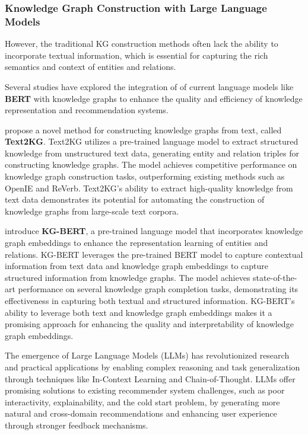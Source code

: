\documentclass{article}
\begin{document}
\subsubsection{Knowledge Graph Construction with Large Language Models}
However, the traditional KG construction methods often lack the ability to incorporate textual information, which is essential for capturing the rich semantics and context of entities and relations. 

Several studies have explored the integration of of current language models like \textbf{BERT} with knowledge graphs to enhance the quality and efficiency of knowledge representation and recommendation systems.

\textbf{\cite{xu2021text2kg}} propose a novel method for constructing knowledge graphs from text, called \textbf{Text2KG}. Text2KG utilizes a pre-trained language model to extract structured knowledge from unstructured text data, generating entity and relation triples for constructing knowledge graphs. The model achieves competitive performance on knowledge graph construction tasks, outperforming existing methods such as OpenIE and ReVerb. Text2KG's ability to extract high-quality knowledge from text data demonstrates its potential for automating the construction of knowledge graphs from large-scale text corpora.

\textbf{\cite{zhang2021kgbert}} introduce \textbf{KG-BERT}, a pre-trained language model that incorporates knowledge graph embeddings to enhance the representation learning of entities and relations. KG-BERT leverages the pre-trained BERT model to capture contextual information from text data and knowledge graph embeddings to capture structured information from knowledge graphs. The model achieves state-of-the-art performance on several knowledge graph completion tasks, demonstrating its effectiveness in capturing both textual and structured information. KG-BERT's ability to leverage both text and knowledge graph embeddings makes it a promising approach for enhancing the quality and interpretability of knowledge graph embeddings.

The emergence of Large Language Models (LLMs) has revolutionized research and practical applications by enabling complex reasoning and task generalization through techniques like In-Context Learning and Chain-of-Thought. LLMs offer promising solutions to existing recommender system challenges, such as poor interactivity, explainability, and the cold start problem, by generating more natural and cross-domain recommendations and enhancing user experience through stronger feedback mechanisms.
\end{document}
